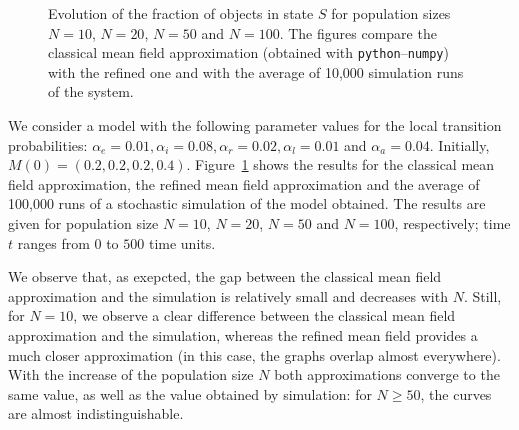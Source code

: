 \documentclass{elsarticle}
\begin{document}
\begin{figure}[ht]
  \caption{\label{fig:res} Evolution of the fraction of objects in
    state $S$ for population sizes $N=10$, $N=20$, $N=50$ and
    $N=100$. The figures compare the classical mean field
    approximation (obtained with \texttt{python}--\texttt{numpy}) with
    the refined one and with the average of 10,000 simulation runs of
    the system.  }
\end{figure}

We consider a model with the following parameter values for the local
transition probabilities:
$\alpha_e=0.01, \alpha_i=0.08,\alpha_r=0.02,\alpha_l=0.01$ and
$\alpha_a=0.04$. Initially,
$M(0)=(0.2,0.2,0.2,0.4)$. Figure~\ref{fig:res} shows the results for
the classical mean field approximation, the refined mean field
approximation and the average of 100,000 runs of a stochastic
simulation of the model obtained. The results are given for
population size $N=10$, $N=20$, $N=50$ and $N=100$, respectively; time
$t$ ranges from $0$ to $500$ time units.

We observe that, as exepcted, the gap between the classical mean field
approximation and the simulation is relatively small and decreases
with $N$. Still, for $N=10$, we observe a clear difference between the
classical mean field approximation and the simulation, whereas the
refined mean field provides a much closer approximation (in this case,
the graphs overlap almost everywhere). With the increase of the
population size $N$ both approximations converge to the same value, as
well as the value obtained by simulation: for $N\ge50$, the curves
are almost indistinguishable.
\end{document}
